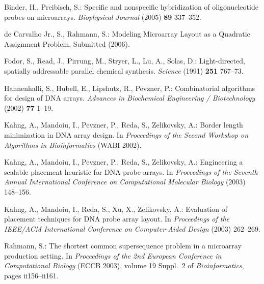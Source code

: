 \documentclass{llncs}
\newcommand{\ignore}[1]{}
\begin{document}
\begin{thebibliography}{5}

Binder, H., Preibisch, S.:
Specific and nonspecific hybridization of oligonucleotide probes on microarrays.
{\it Biophysical Journal} (2005) {\bf 89} 337--352.

de Carvalho Jr., S., Rahmann, S.:
Modeling Microarray Layout as a Quadratic Assignment Problem.
Submitted (2006).

\ignore{
\bibitem{CHASE76}
Chase, P.:
Subsequence numbers and logarithmic concavity.
{\it Discrete Mathematics} (1976) {\bf 16} 123--140.

\bibitem{FELDMAN93}
Feldman, W., Pevzner, P.:
Gray code masks for sequencing by hibridization.
{\it Genomics} (1994) {\bf 23} 233--235.
}

Fodor, S., Read, J., Pirrung, M., Stryer, L., Lu, A., Solas, D.:
Light-directed, spatially addressable parallel chemical synthesis.
{\it Science} (1991) {\bf 251} 767--73.

Hannenhalli, S., Hubell, E., Lipshutz, R., Pevzner, P.:
Combinatorial algorithms for design of DNA arrays.
{\it Advances in Biochemical Engineering / Biotechnology} (2002) {\bf 77} 1--19.

Kahng, A., Mandoiu, I., Pevzner, P., Reda, S., Zelikovsky, A.:
Border length minimization in DNA array design.
In {\it Proceedings of the Second Workshop on Algorithms in Bioinformatics} (WABI 2002).

Kahng, A., Mandoiu, I., Pevzner, P., Reda, S., Zelikovsky, A.:
Engineering a scalable placement heuristic for DNA probe arrays.
In {\it Proceedings of the Seventh Annual International Conference on Computational
Molecular Biology} (2003) 148--156.

Kahng, A., Mandoiu, I., Reda, S., Xu, X., Zelikovsky, A.:
Evaluation of placement techniques for DNA probe array layout.
In {\it Proceedings of the IEEE/ACM International Conference on Computer-Aided Design}
(2003) 262--269.

Rahmann, S.:
The shortest common supersequence problem in a microarray production setting.
In {\it Proceedings of the 2nd European Conference in Computational Biology}
({ECCB} 2003), volume 19 Suppl.~2 of {\it Bioinformatics}, pages ii156--ii161.

\end{thebibliography}
\end{document}

